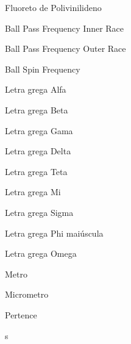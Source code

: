 \documentclass[
	12pt,				
	oneside,			
	a4paper,			
	english,			
	brazil				
	]{abntex2ppgsi}
\begin{document}
\listoffigures*
\cleardoublepage
\listoftables*
\cleardoublepage

%
%
\begin{siglas}
  \item[PVDF] Fluoreto de Polivinilideno
  \item[BPFI] Ball Pass Frequency Inner Race
  \item[BPFO] Ball Pass Frequency Outer Race
  \item[BSF] Ball Spin Frequency 
\end{siglas}


\begin{simbolos}
  \item[$ \alpha $] Letra grega Alfa
  \item[$ \beta $] Letra grega Beta
  \item[$ \gamma $] Letra grega Gama
  \item[$ \delta $] Letra grega Delta
  \item[$ \theta $] Letra grega Teta  
  \item[$ \mu $] Letra grega Mi  
  \item[$ \sigma $] Letra grega Sigma
  \item[$ \upphi $] Letra grega Phi maiúscula
  \item[$ \omega $] Letra grega Omega
  \item[\SI{}{\metre}] Metro  
  \item[\SI{}{\micro\metre}] Micrometro
  \item[$ \in $] Pertence
\end{simbolos}

\tableofcontents*
\cleardoublepage
s


\textual
\end{document}
